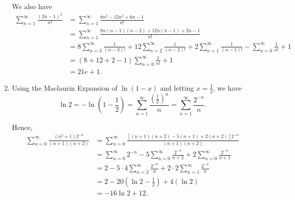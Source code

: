 \begin{enumerate}
          We also have
          \begin{align*}
              \sum_{n = 1}^{\infty} \frac{(2n - 1)^3}{n!} & = \sum_{n = 1}^{\infty} \frac{8n^3 - 12n^2 + 6n - 1}{n!}                                                                                                                       \\
                                                          & = \sum_{n = 1}^{\infty} \frac{8n(n - 1)(n - 2) + 12 n (n - 1) + 2n - 1}{n!}                                                                                                    \\
                                                          & = 8 \sum_{n = 3}^{\infty} \frac{1}{(n - 3)!} + 12 \sum_{n = 2}^{\infty}\frac{1}{(n - 2)!} + 2 \sum_{n = 1}^{\infty} \frac{1}{(n - 1)!} - \sum_{n = 0}^{\infty}\frac{1}{n!} + 1 \\
                                                          & = (8 + 12 + 2 - 1) \sum_{n = 0}^{\infty} \frac{1}{n!} + 1                                                                                                                      \\
                                                          & = 21e + 1.
          \end{align*}

    \item Using the Maclaurin Expansion of \(\ln(1 - x)\) and letting \(x = \frac{1}{2}\), we have
          \[
              \ln 2 = - \ln \left(1 - \frac{1}{2}\right) = \sum_{n = 1}^{\infty} \frac{\left(\frac{1}{2}\right)^n}{n} =  \sum_{n = 1}^{\infty} \frac{2^{-n}}{n}.
          \]

          Hence,
          \begin{align*}
              \sum_{n = 0}^{\infty} \frac{(n^2 + 1) 2^{-n}}{(n + 1)(n + 2)} & = \sum_{n = 0}^{\infty} \frac{[(n + 1)(n + 2) - 5(n + 1) + 2(n + 2)]2^{-n}}{(n + 1)(n + 2)}                                 \\
                                                                            & = \sum_{n = 0}^{\infty} 2^{-n} - 5\sum_{n = 0}^{\infty} \frac{2^{-n}}{n + 2} + 2 \sum_{n = 0}^{\infty} \frac{2^{-n}}{n + 1} \\
                                                                            & = 2 - 5 \cdot 4 \sum_{n = 2}^{\infty} \frac{2^{-n}}{n} + 2 \cdot 2 \sum_{n = 1}^{\infty} \frac{2^{-n}}{n}                   \\
                                                                            & = 2 - 20 (\ln 2 - \frac{1}{2}) +4 (\ln 2)                                                                                   \\
                                                                            & = -16 \ln 2 + 12.
          \end{align*}
\end{enumerate}